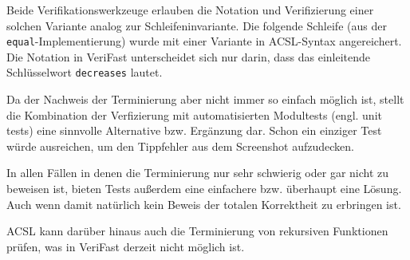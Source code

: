 Beide Verifikationswerkzeuge erlauben die Notation und Verifizierung einer solchen Variante analog zur
Schleifeninvariante. Die folgende Schleife (aus der \texttt{equal}-Implementierung) wurde mit einer Variante 
in ACSL-Syntax angereichert. Die Notation in VeriFast unterscheidet sich nur darin, dass das einleitende
Schlüsselwort \texttt{decreases} lautet.



Da der Nachweis der Terminierung aber nicht immer so einfach möglich ist, stellt die Kombination
der Verfizierung mit automatisierten Modultests (engl. unit tests) eine sinnvolle Alternative bzw. Ergänzung dar.
Schon ein einziger Test würde ausreichen, um den Tippfehler aus dem Screenshot aufzudecken. 

In allen Fällen in denen die Terminierung nur sehr schwierig oder gar nicht zu beweisen ist, bieten
Tests außerdem eine einfachere bzw. überhaupt eine Lösung. Auch wenn damit natürlich
kein Beweis der totalen Korrektheit zu erbringen ist.

ACSL kann darüber hinaus auch die Terminierung von rekursiven Funktionen prüfen, was in
VeriFast derzeit nicht möglich ist.
